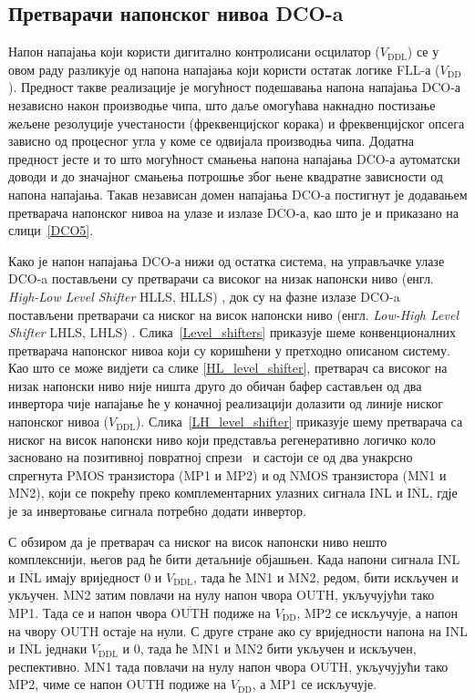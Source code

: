 \documentclass[master]{finthesis}
\makeatletter
\newcommand*{\engl}[2][\@empty]{%
    \edef\theacronym{#1}%
    (енгл. \foreignlanguage{english}{\emph{#2}%
    \ifx\theacronym\@empty \else , #1\fi})%
}
\def \FLL  {FLL} %
\def \DCO  {DCO} %
\makeatother
\begin{document}
\subsection{Претварачи напонског нивоа \DCO-a} \label{LS chapter}
Напон напајања који користи дигитално контролисани осцилатор ($V_\text{DDL}$) се у овом раду разликује од напона напајања који користи остатак логике \FLL-а ($V_\text{DD}$). Предност такве реализације је могућност подешавања напона напајања \DCO-а независно након производње чипа, што даље омогућава накнадно постизање жељене резолуције учестаности (фреквенцијског корака) и фреквенцијског опсега зависно од процесног угла у коме се одвијала производња чипа. Додатна предност јесте и то што могућност смањења напона напајања \DCO-а аутоматски доводи и до значајног смањења потрошње због њене квадратне зависности од напона напајања.
Такав независан домен напајања \DCO-а постигнут је додавањем претварача напонског нивоа на улазе и излазе \DCO-а, као што је и приказано на слици~\ref{DCO5}. \par

Како је напон напајања \DCO-а нижи од остатка система, на управљачке улазе \DCO-a постављени су претварачи са високог на низак напонски ниво \engl[HLLS]{High-Low Level Shifter}, док су на фазне излазе \DCO-a постављени претварачи са ниског на висок напонски ниво \engl[LHLS]{Low-High Level Shifter}. Слика~\ref{Level_shifters} приказује шеме конвенционалних претварача напонског нивоа који су коришћени у претходно описаном систему. Као што се може видјети са слике \ref{HL_level_shifter}, претварач са високог на низак напонски ниво није ништа друго до обичан бафер састављен од два инвертора чије напајање ће у коначној реализацији долазити од линије ниског напонског нивоа ($V_\text{DDL}$). Слика~\ref{LH_level_shifter} приказује шему претварача са ниског на висок напонски ниво који представља регенеративно логичко коло засновано на позитивној повратној спрези~\cite{Osaki:6198744} и састоји се од два унакрсно спрегнута PMOS транзистора (MP1 и MP2) и од NMOS транзистора (MN1 и MN2), који се покрећу преко комплементарних улазних сигнала INL и $\overline{\mbox{INL}}$, гдје је за инвертовање сигнала потребно додати инвертор. \par
С обзиром да је претварач са ниског на висок напонски ниво нешто комплекснији, његов рад ће бити детаљније објашњен. Када напони сигнала INL и $\overline{\mbox{INL}}$ имају вриједност 0 и $V_\text{DDL}$, тада ће MN1 и MN2, редом, бити искључен и укључен. MN2 затим повлачи на нулу напон чвора OUTH, укључујући тако MP1. Тада се и напон чвора $\overline{\mbox{OUTH}}$ подиже на $V_\text{DD}$, MP2 се искључује, а напон на чвору OUTH остаје на нули. С друге стране ако су вриједности напона на INL и $\overline{\mbox{INL}}$ једнаки $V_\text{DDL}$ и 0, тада ће MN1 и MN2 бити укључен и искључен, респективно. MN1 тада повлачи на нулу напон чвора $\overline{\mbox{OUTH}}$, укључујући тако MP2, чиме се напон OUTH подиже на $V_\text{DD}$, а MP1 се искључује. \par
\end{document}
